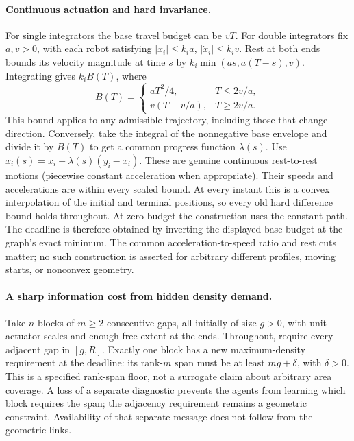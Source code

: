 \documentclass[11pt]{article}
\begin{document}
\paragraph{Continuous actuation and hard invariance.}
For single integrators the base travel budget can be \(vT\).
For double integrators fix \(a,v>0\), with each robot satisfying
\(|\ddot x_i|\le k_i a\), \(|\dot x_i|\le k_i v\).
Rest at both ends bounds its velocity magnitude at time \(s\)
by \(k_i\min(as,a(T-s),v)\). Integrating gives \(k_iB(T)\), where
\[
 B(T)=
 \begin{cases}
 aT^2/4,&T\le 2v/a,\\
 v(T-v/a),&T\ge 2v/a .
 \end{cases}
\]
This bound applies to any admissible trajectory, including those
that change direction. Conversely, take the integral of the
nonnegative base envelope and divide it by \(B(T)\) to get
a common progress function \(\lambda(s)\). Use
\(x_i(s)=x_i+\lambda(s)(y_i-x_i)\). These are genuine continuous
rest-to-rest motions (piecewise constant acceleration when
appropriate). Their speeds and accelerations are within every
scaled bound. At every instant this is a convex interpolation
of the initial and terminal positions, so every old hard
difference bound holds throughout. At zero budget the construction
uses the constant path. The deadline is therefore obtained by
inverting the displayed base budget at the graph's exact minimum.
The common acceleration-to-speed ratio and rest cuts matter;
no such construction is asserted for arbitrary different profiles,
moving starts, or nonconvex geometry.

\paragraph{A sharp information cost from hidden density demand.}
Take \(n\) blocks of \(m\ge2\) consecutive gaps, all initially of
size \(g>0\), with unit actuator scales and enough free extent
at the ends. Throughout, require every adjacent gap in \([g,R]\).
Exactly one block has a new maximum-density requirement at the
deadline: its rank-\(m\) span must be at least \(mg+\delta\), with
\(\delta>0\). This is a specified rank-span floor, not a surrogate
claim about arbitrary area coverage. A loss of a separate
diagnostic prevents the agents from learning which block requires
the span; the adjacency requirement remains a geometric constraint.
Availability of that separate message does not follow from the
geometric links.
\end{document}
